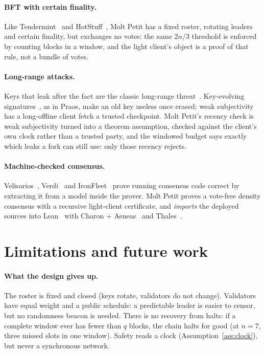 \documentclass[10pt]{article}
\newcommand{\quorum}{\ensuremath{q}}
\begin{document}
\paragraph{BFT with certain finality.} Like Tendermint~\cite{tendermint}
and HotStuff~\cite{hotstuff}, Molt Petit has a fixed roster, rotating
leaders and certain finality, but exchanges no votes: the same $2n/3$
threshold is enforced by counting blocks in a window, and the light
client's object is a proof of that rule, not a bundle of votes.

\paragraph{Long-range attacks.} Keys that leak after the fact are the
classic long-range threat~\cite{stakebleeding}. Key-evolving
signatures~\cite{forwardsec}, as in Praos, make an old key useless once
erased; weak subjectivity~\cite{weaksubj} has a long-offline client fetch
a trusted checkpoint. Molt Petit's recency check is weak subjectivity
turned into a theorem assumption, checked against the client's own clock
rather than a trusted party, and the windowed budget says exactly which
leaks a fork can still use: only those recency rejects.

\paragraph{Machine-checked consensus.} Velisarios~\cite{velisarios},
Verdi~\cite{verdi} and IronFleet~\cite{ironfleet} prove running consensus
code correct by extracting it from a model inside the prover. Molt Petit
proves a vote-free density consensus with a recursive light-client
certificate, and \emph{imports} the deployed sources into
Lean~\cite{lean,mathlib} with Charon + Aeneas~\cite{aeneas} and
Thales~\cite{thales}.

\section{Limitations and future work}
\label{sec:limitations}

\paragraph{What the design gives up.} The roster is fixed and closed
(keys rotate, validators do not change). Validators have equal weight and
a public schedule: a predictable leader is easier to censor, but no
randomness beacon is needed. There is no recovery from halts: if a
complete window ever has fewer than $\quorum$ blocks, the chain halts for
good (at $n = 7$, three missed slots in one window). Safety reads a clock
(Assumption~\ref{ass:clock}), but never a synchronous network.
\end{document}
